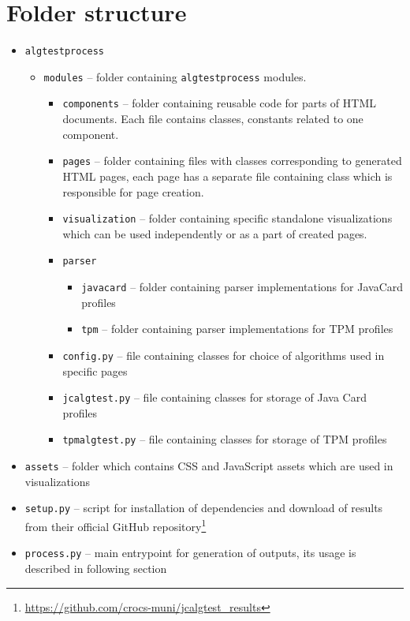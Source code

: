 \section{Folder structure}
\begin{itemize}
    \item \texttt{algtestprocess}
        \begin{itemize}
            \item \texttt{modules} -- folder containing \texttt{algtestprocess} modules.
                \begin{itemize}
                    \item \texttt{components} -- folder containing reusable code for parts of HTML documents. Each file contains classes, constants related to one component.
                    \item \texttt{pages} -- folder containing files with classes corresponding to generated HTML pages, each page has a separate file containing class which is responsible for page creation.
                    \item \texttt{visualization} -- folder containing specific standalone visualizations which can be used independently or as a part of created pages.
                    \item \texttt{parser}
                        \begin{itemize}
                            \item \texttt{javacard} -- folder containing parser implementations for JavaCard profiles
                            \item \texttt{tpm} -- folder containing parser implementations for TPM profiles
                        \end{itemize}
                    \item \texttt{config.py} -- file containing classes for choice of algorithms used in specific pages
                    \item \texttt{jcalgtest.py} -- file containing classes for storage of Java Card profiles
                    \item \texttt{tpmalgtest.py} -- file containing classes for storage of TPM profiles
                \end{itemize}
        \end{itemize}
    \item \texttt{assets} -- folder which contains CSS and JavaScript assets which are used in visualizations
    \item \texttt{setup.py} -- script for installation of dependencies and download of results from their official GitHub repository\footnote{\url{https://github.com/crocs-muni/jcalgtest_results}}
    \item \texttt{process.py} -- main entrypoint for generation of outputs, its usage is described in following section
\end{itemize}

